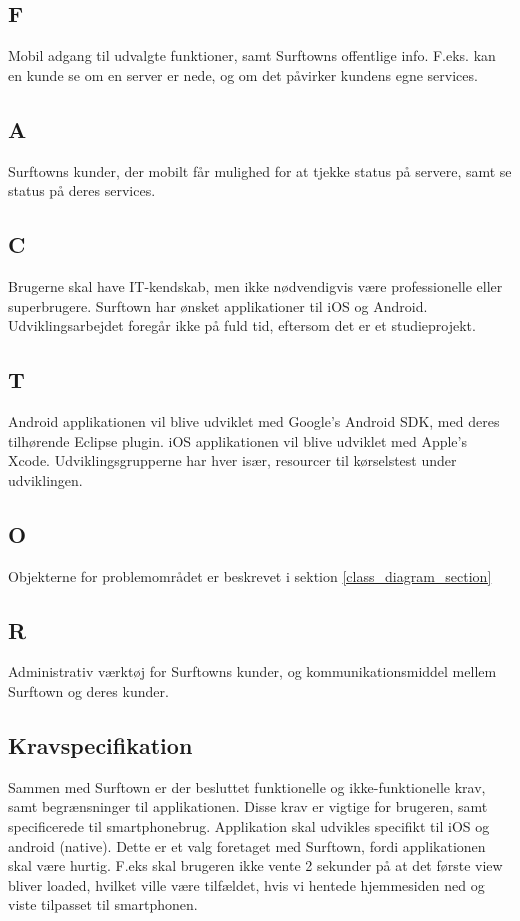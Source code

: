 \documentclass[12pt]{article}
\begin{document}
\subsection*{F}
Mobil adgang til udvalgte funktioner, samt Surftowns offentlige info. F.eks. kan en kunde se om en server er nede, og om det påvirker kundens egne services.
\subsection*{A}
Surftowns kunder, der mobilt får mulighed for at tjekke status på servere, samt se status på deres services.
\subsection*{C}
Brugerne skal have IT-kendskab, men ikke nødvendigvis være professionelle eller superbrugere. Surftown har ønsket applikationer til iOS og Android. Udviklingsarbejdet foregår ikke på fuld tid, eftersom det er et studieprojekt.
\subsection*{T}
Android applikationen vil blive udviklet med Google's Android SDK, med deres tilhørende Eclipse plugin. iOS applikationen vil blive udviklet med Apple's Xcode. Udviklingsgrupperne har hver især, resourcer til kørselstest under udviklingen.
\subsection*{O}
Objekterne for problemområdet er beskrevet i sektion \ref{class_diagram_section}
\subsection*{R}
Administrativ værktøj for Surftowns kunder, og kommunikationsmiddel mellem Surftown og deres kunder.

\subsection{Kravspecifikation}
Sammen med Surftown er der besluttet funktionelle og ikke-funktionelle krav, samt begrænsninger til applikationen. Disse krav er vigtige for brugeren, samt specificerede til smartphonebrug. Applikation skal udvikles specifikt til iOS og android (native). Dette er et valg foretaget med Surftown, fordi applikationen skal være hurtig. F.eks skal brugeren ikke vente 2 sekunder på at det første view bliver loaded, hvilket ville være tilfældet, hvis vi hentede hjemmesiden ned og viste tilpasset til smartphonen. 
\end{document}

